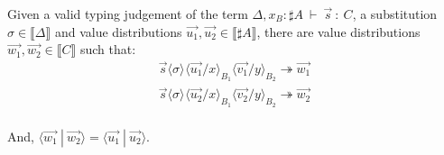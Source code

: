 \documentclass[runningheads,orivec]{llncs}
\newcommand\ansubst[2]{\ensuremath{\langle #1 \rangle_{#2}}}
\def\scal#1#2{\langle{#1}~|~{#2}\rangle}
\def\eval{\twoheadrightarrow}
\def\sem#1{\llbracket#1\rrbracket}
\def\TYP#1#2#3{#1~{\vdash}~#2~{:}~#3}
\begin{document}
\begin{lemma}\label{lem:InnerProdSingleVar} %
Given a valid typing judgement of the term $\TYP{\Delta,x_B:\sharp A}{\vec{s}}{C}$, a substitution $\sigma\in\sem{\Delta}$ and value distributions $\vec{u_1},\vec{u_2}\in\sem{\sharp A}$, there are value distributions $\vec{w_1}, \vec{w_2}\in\sem{C}$ such that:
\[
\begin{array}{c}
    \vec{s}\ansubst{\sigma}{}\ansubst{\vec{u_1}/x}{B_1}{\ansubst{\vec{v_1}/y}{B_2}}\eval\vec{w_1}\\
    \vec{s}\ansubst{\sigma}{}\ansubst{\vec{u_2}/x}{B_1}{\ansubst{\vec{v_2}/y}{B_2}}\eval\vec{w_2}\\
\end{array}
\]

And, $\scal{\vec{w_1}}{\vec{w_2}} = \scal{\vec{u_1}}{\vec{u_2}}$.
\end{lemma}
\end{document}
